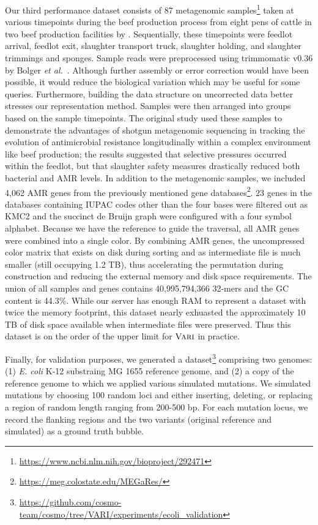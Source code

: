 Our third performance dataset consists of 87 metagenomic samples\footnote{\url{https://www.ncbi.nlm.nih.gov/bioproject/292471}} taken at various timepoints during the beef production process from eight pens of cattle in two beef production facilities by \cite{noyes2016resistome}.  Sequentially, these timepoints were feedlot arrival, feedlot exit, slaughter transport truck, slaughter holding, and slaughter trimmings and sponges.  Sample reads were preprocessed using trimmomatic v0.36 by Bolger {\it et al.}~\citep{bolger2014trimmomatic}.  Although further assembly or error correction would have been possible, it would reduce the biological variation which may be useful for some queries.  Furthermore, building the data structure on uncorrected data better stresses our representation method.  Samples were then arranged into groups based on the sample timepoints. The original study used these samples to demonstrate the advantages of shotgun metagenomic sequencing in tracking the evolution of antimicrobial resistance longitudinally within a complex environment like beef production; the results suggested that selective pressures occurred within the feedlot, but that slaughter safety measures drastically reduced both bacterial and AMR levels.  In addition to the metagenomic samples, we included 4,062 AMR genes from the previously mentioned gene databases\footnote{\url{https://meg.colostate.edu/MEGaRes/}}.  23 genes in the databases containing IUPAC codes other than the four bases were filtered out as KMC2 and the succinct de Bruijn graph were configured with a four symbol alphabet.  Because we have the reference to guide the traversal, all AMR genes were combined into a single color.  By combining AMR genes, the uncompressed color matrix that exists on disk during sorting and as intermediate file is much smaller (still occupying 1.2 TB), thus accelerating the permutation during construction and reducing the external memory and disk space requirements.  The union of all samples and genes contains 40,995,794,366 32-mers and the GC content is 44.3\%.  While our server has enough RAM to represent a dataset with twice the memory footprint, this dataset nearly exhuasted the approximately 10 TB of disk space available when intermediate files were preserved.  Thus this dataset is on the order of the upper limit for $\mbox{\rm {\sc Vari}}$ in practice.

Finally, for validation purposes, we generated a dataset\footnote{\url{https://github.com/cosmo-team/cosmo/tree/VARI/experiments/ecoli_validation}} comprising two genomes: (1) \emph{E. coli} K-12 substraing MG 1655 reference genome, and (2) a copy of the reference genome to which we applied various simulated mutations.  We simulated mutations by choosing 100 random loci and either inserting, deleting, or replacing a region of random length ranging from 200-500 bp.  For each mutation locus, we record the flanking regions and the two variants (original reference and simulated) as a ground truth bubble.  



